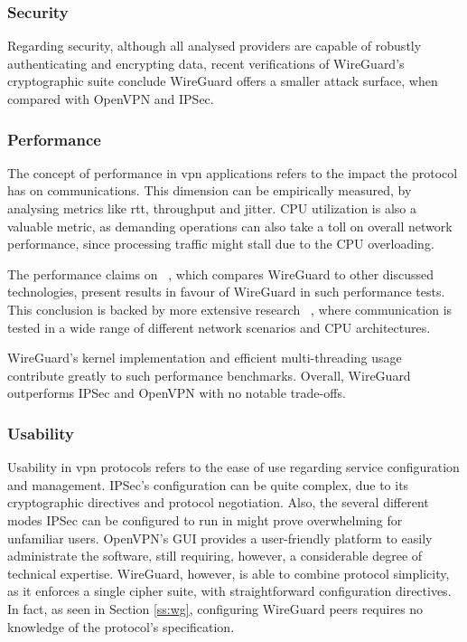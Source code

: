 \documentclass[11pt,twoside,a4paper]{report}
\begin{document}
\subsubsection{Security}

Regarding security, although all analysed providers are capable of robustly authenticating and encrypting data, recent verifications of WireGuard's cryptographic suite \cite{lipp2019mechanised, dowling2018cryptographic} conclude WireGuard offers a smaller attack surface, when compared with OpenVPN and IPSec.

\subsubsection{Performance}

The concept of performance in \ac{vpn} applications refers to the impact the protocol has on communications. This dimension can be empirically measured, by analysing metrics like \ac{rtt}, throughput and jitter. CPU utilization is also a valuable metric, as demanding operations can also take a toll on overall network performance, since processing traffic might stall due to the CPU overloading.

The performance claims on ~\cite{donenfeld2017wireguard}, which compares WireGuard to other discussed technologies, present results in favour of WireGuard in such performance tests. This conclusion is backed by more extensive research ~\cite{mackey2020performance, osswald2020performance}, where communication is tested in a wide range of different network scenarios and CPU architectures.

WireGuard's kernel implementation and efficient multi-threading usage contribute greatly to such performance benchmarks. Overall, WireGuard outperforms IPSec and OpenVPN with no notable trade-offs.

\subsubsection{Usability}

Usability in \ac{vpn} protocols refers to the ease of use regarding service configuration and management. IPSec's configuration can be quite complex, due to its cryptographic directives and protocol negotiation. Also, the several different modes IPSec can be configured to run in might prove overwhelming for unfamiliar users. OpenVPN's GUI provides a user-friendly platform to easily administrate the software, still requiring, however, a considerable degree of technical expertise. WireGuard, however, is able to combine protocol simplicity, as it enforces a single cipher suite, with straightforward configuration directives. In fact, as seen in Section \ref{ss:wg}, configuring WireGuard peers requires no knowledge of the protocol's specification.
\end{document}
